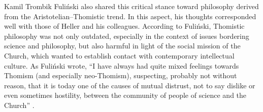 \begin{artengenv}{Kamil Trombik}
Fuliński also shared this critical stance toward philosophy derived from the Aristotelian–Thomistic trend. In this aspect, his thoughts corresponded well with those of Heller and his colleagues. According to Fuliński, Thomistic philosophy was not only outdated, especially in the context of issues bordering science and philosophy, but also harmful in light of the social mission of the Church, which wanted to establish contact with contemporary intellectual culture. As Fuliński wrote, ``I have always had quite mixed feelings towards Thomism (and especially neo-Thomism), suspecting, probably not without reason, that it is today one of the causes of mutual distrust, not to say dislike or even sometimes hostility, between the community of people of science and the Church''
\parencite[][p.227]{fulinski_maszyna_1989}.%





\end{artengenv}
